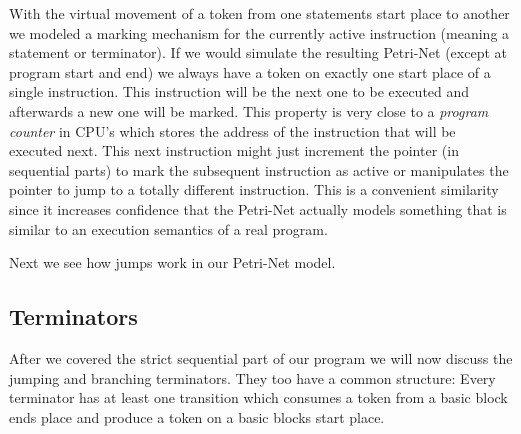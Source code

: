 With the virtual movement of a token from one statements start place to another we modeled a marking mechanism for the currently active instruction (meaning a statement or terminator).
If we would simulate the resulting Petri-Net (except at program start and end) we always have a token on exactly one start place of a single instruction.
This instruction will be the next one to be executed and afterwards a new one will be marked.
This property is very close to a \textit{program counter} in CPU's which stores the address of the instruction that will be executed next.
This next instruction might just increment the pointer (in sequential parts) to mark the subsequent instruction as active or manipulates the pointer to jump to a totally different instruction.
This is a convenient similarity since it increases confidence that the Petri-Net actually models something that is similar to an execution semantics of a real program.

Next we see how jumps work in our Petri-Net model.

\subsection{Terminators}
After we covered the strict sequential part of our program we will now discuss the jumping and branching terminators.
They too have a common structure:
Every terminator has at least one transition which consumes a token from a basic block ends place and produce a token on a basic blocks start place.

